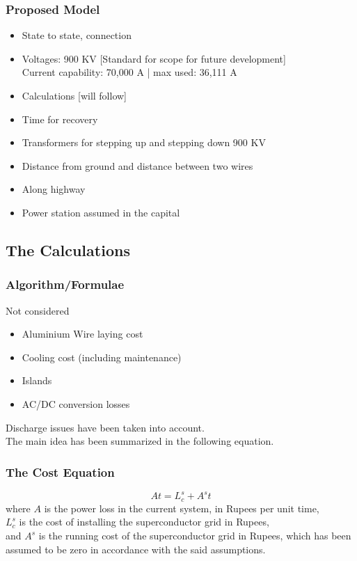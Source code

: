 \documentclass{beamer}
\begin{document}
		\begin{frame}
			\frametitle{Proposed Model}
				\begin{itemize}
					\item State to state, connection
					\item Voltages: 900 KV [Standard for scope for future development]\\
					Current capability: 70,000 A | max used: 36,111 A
					\item Calculations [will follow]
					\item Time for recovery ~ 
					\item Transformers for stepping up and stepping down 900 KV
					\item Distance from ground and distance between two wires
					\item Along highway
					\item Power station assumed in the capital
				\end{itemize}
		\end{frame}

	\subsection{The Calculations}
		\begin{frame}
			\frametitle{Algorithm/Formulae}
			Not considered
				\begin{itemize}
					\item Aluminium Wire laying cost
					\item Cooling cost (including maintenance)
					\item Islands
					\item AC/DC conversion losses
				\end{itemize}
			Discharge issues have been taken into account.\\
			The main idea has been summarized in the following equation.
		\end{frame}

		\begin{frame}
			\frametitle{The Cost Equation}
				\begin{equation}
					At = L^s_c + A^st
				\end{equation}
				where $A$ is the power loss in the current system, in Rupees per unit time,\\
				$L^s_c$ is the cost of installing the superconductor grid in Rupees,\\
				and $A^s$ is the running cost of the superconductor grid in Rupees, which has been assumed to be zero in accordance with the said assumptions.
		\end{frame}
\end{document}
